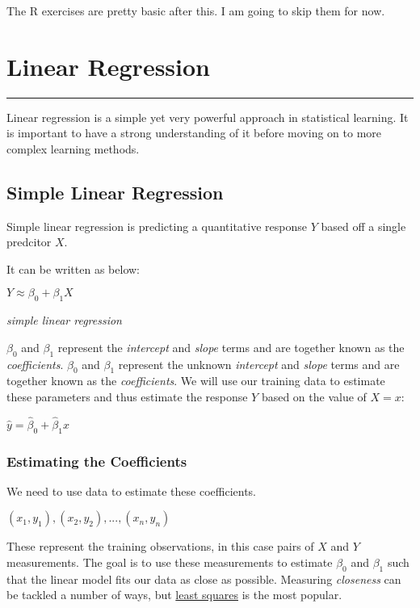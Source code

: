 \documentclass[]{book}
\theoremstyle{definition}
\theoremstyle{definition}
\theoremstyle{definition}
\theoremstyle{remark}
\begin{document}
The R exercises are pretty basic after this. I am going to skip them for
now.

\chapter{Linear Regression}\label{linear-regression}

\begin{center}\rule{0.5\linewidth}{\linethickness}\end{center}

Linear regression is a simple yet very powerful approach in statistical
learning. It is important to have a strong understanding of it before
moving on to more complex learning methods.

\section{Simple Linear Regression}\label{simple-linear-regression}

Simple linear regression is predicting a quantitative response \(Y\)
based off a single predcitor \(X\).

It can be written as below:

\(Y \approx \beta_0 + \beta_1X\)

\emph{simple linear regression}

\(\beta_0\) and \(\beta_1\) represent the \emph{intercept} and
\emph{slope} terms and are together known as the \emph{coefficients}.
\(\beta_0\) and \(\beta_1\) represent the unknown \emph{intercept} and
\emph{slope} terms and are together known as the \emph{coefficients}. We
will use our training data to estimate these parameters and thus
estimate the response \(Y\) based on the value of \(X = x\):

\(\hat y = \hat\beta_0 + \hat\beta_1x\)

\subsection{Estimating the
Coefficients}\label{estimating-the-coefficients}

We need to use data to estimate these coefficients.

\((x_1,y_1), (x_2,y_2),..., (x_n,y_n)\)

These represent the training observations, in this case pairs of \(X\)
and \(Y\) measurements. The goal is to use these measurements to
estimate \(\beta_0\) and \(\beta_1\) such that the linear model fits our
data as close as possible. Measuring \emph{closeness} can be tackled a
number of ways, but
\href{https://en.wikipedia.org/wiki/Least_squares}{least squares} is the
most popular.
\end{document}
